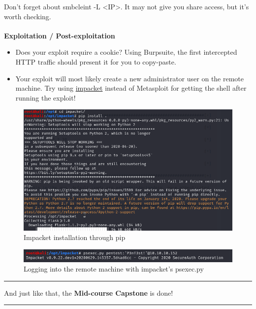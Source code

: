 \documentclass[a4paper,11pt]{article}
\renewcommand{\tt}[2][tt]{\textcolor{#1}{\ttfamily #2}}%
\begin{document}
Don't forget about \tt{smbcleint -L <IP>}. It may not give you share access, but it's worth checking.
\\
\\
{\bfseries Exploitation / Post-exploitation}

\begin{itemize}
    \item Does your exploit require a cookie? Using Burpsuite, the first intercepted HTTP traffic should present it for you to copy-paste.
    \item Your exploit will most likely create a new administrator user on the remote machine. Try using \href{https://github.com/SecureAuthCorp/impacket}{impacket} instead of Metasploit for getting the shell after running the exploit!
\end{itemize}
\pagebreak

\begin{figure}[h]
    \centering
    \includegraphics[width=1\textwidth]{images/pipimpacket-new.png}
    \caption{Impacket installation through \tt{pip}}
\end{figure}

\begin{figure}[h]
    \centering
    \includegraphics[width=1\textwidth]{images/psexec-impacket-new.png}
    \caption{Logging into the remote machine with impacket's \tt{psexec.py}}
\end{figure}

\vspace{3cm}
\par\noindent\rule{\textwidth}{0.4pt}
\begin{center}
    And just like that, the {\bfseries Mid-course Capstone} is done!
\par\noindent\rule{\textwidth}{0.4pt}
\end{center}
\pagebreak
\end{document}

